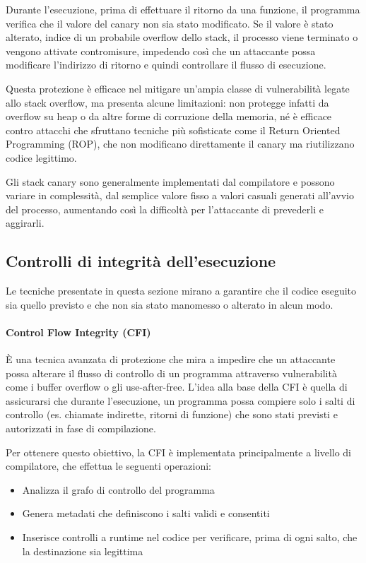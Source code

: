 Durante l'esecuzione, prima di effettuare il ritorno da una funzione, il programma
verifica che il valore del canary non sia stato modificato. Se il valore è stato
alterato, indice di un probabile overflow dello stack, il processo viene
terminato o vengono attivate contromisure, impedendo così che un attaccante possa
modificare l'indirizzo di ritorno e quindi controllare il flusso di esecuzione.

Questa protezione è efficace nel mitigare un'ampia classe di vulnerabilità legate
allo stack overflow, ma presenta alcune limitazioni: non protegge infatti da overflow
su heap o da altre forme di corruzione della memoria, né è efficace contro
attacchi che sfruttano tecniche più sofisticate come il Return Oriented
Programming (ROP), che non modificano direttamente il canary ma riutilizzano codice
legittimo.

Gli stack canary sono generalmente implementati dal compilatore e possono variare
in complessità, dal semplice valore fisso a valori casuali generati all'avvio
del processo, aumentando così la difficoltà per l'attaccante di prevederli e aggirarli.~\cite{stack_canaries}

\subsection{Controlli di integrità dell'esecuzione}
\label{sec:execution-integrity} Le tecniche presentate in questa sezione mirano a
garantire che il codice eseguito sia quello previsto e che non sia stato manomesso
o alterato in alcun modo.

\paragraph{Control Flow Integrity (CFI)}
È una tecnica avanzata di protezione che mira a impedire che un attaccante possa
alterare il flusso di controllo di un programma attraverso vulnerabilità come i
buffer overflow o gli use-after-free. L'idea alla base della CFI è quella di assicurarsi
che durante l'esecuzione, un programma possa compiere solo i salti di controllo
(es. chiamate indirette, ritorni di funzione) che sono stati previsti e
autorizzati in fase di compilazione.

Per ottenere questo obiettivo, la CFI è implementata principalmente a livello di
compilatore, che effettua le seguenti operazioni:
\begin{itemize}
  \item Analizza il grafo di controllo del programma

  \item Genera metadati che definiscono i salti validi e consentiti

  \item Inserisce controlli a runtime nel codice per verificare, prima di ogni
    salto, che la destinazione sia legittima
\end{itemize}

